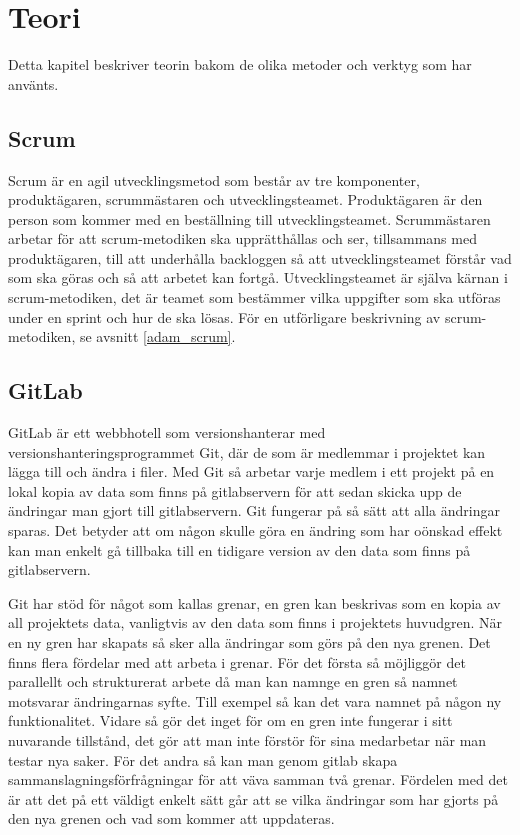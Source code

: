 \chapter{Teori}
Detta kapitel beskriver teorin bakom de olika metoder och verktyg som har använts.

\section{Scrum} \label{scrum}
Scrum är en agil utvecklingsmetod som består av tre komponenter, produktägaren, scrummästaren och utvecklingsteamet.
Produktägaren är den person som kommer med en beställning till utvecklingsteamet.
Scrummästaren arbetar för att scrum-metodiken ska upprätthållas och ser, tillsammans med produktägaren, till att underhålla backloggen så att utvecklingsteamet förstår vad som ska göras och så att arbetet kan fortgå.
Utvecklingsteamet är själva kärnan i scrum-metodiken, det är teamet som bestämmer vilka uppgifter som ska utföras under en sprint och hur de ska lösas.
För en utförligare beskrivning av scrum-metodiken, se avsnitt \ref{adam_scrum}.

\section{GitLab}
GitLab är ett webbhotell som versionshanterar med versionshanteringsprogrammet Git, där de som är medlemmar i projektet kan lägga till och ändra i filer.
Med Git så arbetar varje medlem i ett projekt på en lokal kopia av data som finns på gitlabservern för att sedan skicka upp de ändringar man gjort till gitlabservern. Git fungerar på så sätt att alla ändringar sparas. Det betyder att om någon skulle göra en ändring som har oönskad effekt kan man enkelt gå tillbaka till en tidigare version av den data som finns på gitlabservern.

Git har stöd för något som kallas grenar, en gren kan beskrivas som en kopia av all projektets data, vanligtvis av den data som finns i projektets huvudgren. När en ny gren har skapats så sker alla ändringar som görs på den nya grenen. Det finns flera fördelar med att arbeta i grenar. För det första så möjliggör det parallellt och strukturerat arbete då man kan namnge en gren så namnet motsvarar ändringarnas syfte. Till exempel så kan det vara namnet på någon ny funktionalitet. Vidare så gör det inget för om en gren inte fungerar i sitt nuvarande tillstånd, det gör att man inte förstör för sina medarbetar när man testar nya saker. För det andra så kan man genom gitlab skapa sammanslagningsförfrågningar för att väva samman två grenar. Fördelen med det är att det på ett väldigt enkelt sätt går att se vilka ändringar som har gjorts på den nya grenen och vad som kommer att uppdateras.

